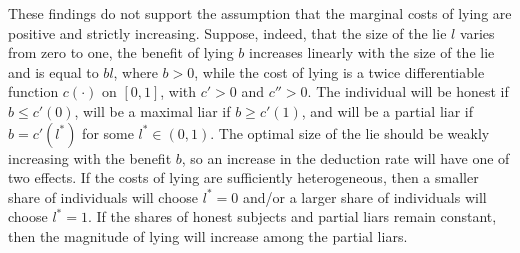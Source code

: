 \documentclass[12pt]{article}
\begin{document}
\par These findings do not support the assumption that the marginal costs of lying are positive and strictly increasing. Suppose, indeed, that the size of the lie $l$ varies from zero to one, the benefit of lying $b$ increases linearly with the size of the lie and is equal to $bl$, where $b>0$, while the cost of lying is a twice differentiable function $c(\cdot)$ on $[0,1]$, with $c'>0$ and $c''>0$. The individual will be honest if $b\leq c'(0)$, will be a maximal liar if $b\geq c'(1)$, and will be a partial liar if $b=c'(l^*)$ for some $l^*\in(0,1)$. The optimal size of the lie should be weakly increasing with the benefit $b$,\footnotemark{}
so an increase in the deduction rate will have one of two effects. If the costs of lying are sufficiently heterogeneous, then a smaller share of individuals will choose $l^*=0$ and/or a larger share of individuals will choose $l^*=1$. If the shares of honest subjects and partial liars remain constant, then the magnitude of lying will increase among the partial liars.    
\end{document}
